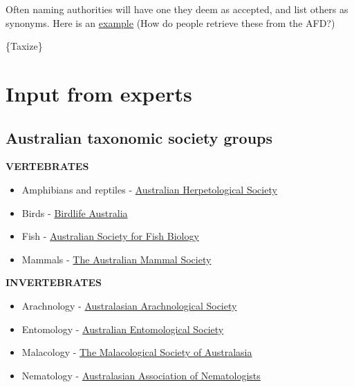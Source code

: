 \documentclass[
  letterpaper,
  DIV=11,
  numbers=noendperiod,
  oneside]{scrreprt}
\providecommand{\tightlist}{%
  \setlength{\itemsep}{0pt}\setlength{\parskip}{0pt}}\usepackage{longtable,booktabs,array}
\begin{document}
Often naming authorities will have one they deem as accepted, and list
others as synonyms. Here is an
\href{https://biodiversity.org.au/afd/taxa/Egernia/names}{example} (How
do people retrieve these from the AFD?)

\{Taxize\}

\hypertarget{input-from-experts}{%
\section{Input from experts}\label{input-from-experts}}

\hypertarget{australian-taxonomic-society-groups}{%
\subsection{Australian taxonomic society
groups}\label{australian-taxonomic-society-groups}}

\textbf{VERTEBRATES}

\begin{itemize}
\tightlist
\item
  Amphibians and reptiles - \href{https://ahs.org.au/}{Australian
  Herpetological Society}\\
\item
  Birds - \href{https://www.birdlife.org.au/}{Birdlife Australia}\\
\item
  Fish - \href{https://www.asfb.org.au/}{Australian Society for Fish
  Biology}\\
\item
  Mammals - \href{https://australianmammals.org.au/}{The Australian
  Mammal Society}
\end{itemize}

\textbf{INVERTEBRATES}

\begin{itemize}
\tightlist
\item
  Arachnology -
  \href{www.australasianarachnologicalsociety.org}{Australasian
  Arachnological Society}\\
\item
  Entomology - \href{https://www.austentsoc.org.au/}{Australian
  Entomological Society}\\
\item
  Malacology - \href{https://www.malsocaus.org/}{The Malacological
  Society of Australasia}\\
\item
  Nematology - \href{https://www.nematologists.org.au/}{Australasian
  Association of Nematologists}
\end{itemize}
\end{document}
